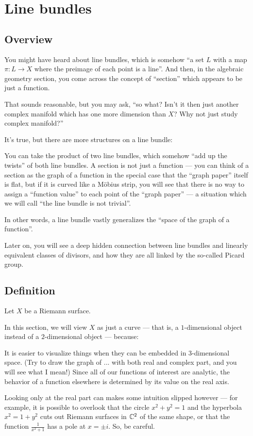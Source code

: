 \chapter{Line bundles}
\label{ch:line_bundles}

\section{Overview}

You might have heard about line bundles, which is somehow ``a set $L$ with a map $\pi \colon L \to
X$ where the preimage of each point is a line''.
And then, in the algebraic geometry section, you come across the concept of ``section'' which
appears to be just a function.

That sounds reasonable, but you may ask, ``so what? Isn't it then just another complex manifold
which has one more dimension than $X$? Why not just study complex manifold?''

It's true, but there are more structures on a line bundle:
\begin{itemize}
	\ii You can take the product of two line bundles, which somehow ``add up the twists'' of
	both line bundles.
	\ii A section is not just a function --- you can think of a section as the graph of a function
	in the special case that the ``graph paper'' itself is flat, but if it is curved like a M\"obius
	strip, you will see that there is no way to assign a ``function value'' to each point of the
	``graph paper'' --- a situation which we will call ``the line bundle is not trivial''.
\end{itemize}

In other words, a line bundle vastly generalizes the ``space of the graph of a function''.

Later on, you will see a deep hidden connection between line bundles and linearly equivalent classes
of divisors, and how they are all linked by the so-called Picard group.

\section{Definition}

Let $X$ be a Riemann surface.

In this section, we will view $X$ as just a curve --- that is, a $1$-dimensional object instead of a
$2$-dimensional object --- because:
\begin{itemize}
	\ii It is easier to visualize things when they can be embedded in $3$-dimensional space.
	(Try to draw the graph of ... with both real and complex part, and you will see what I mean!)
	\ii Since all of our functions of interest are analytic, the behavior of a function elsewhere is
	determined by its value on the real axis.
\end{itemize}
Looking only at the real part can makes some intuition slipped however --- for example, it is
possible to overlook that the circle $x^2 + y^2 = 1$ and the hyperbola $x^2 = 1 + y^2$ cuts out
Riemann surfaces in $\mathbb C^2$ of the same shape, or that the function $\frac{1}{x^2 + 1}$ has a pole
at $x = \pm i$. So, be careful.

